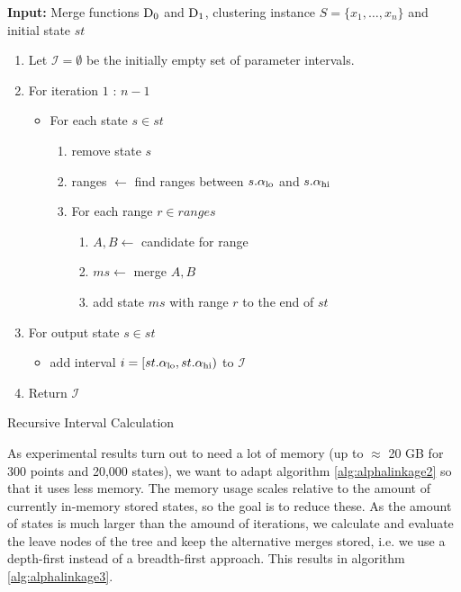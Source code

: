 \begin{algorithm}
    \textbf{Input:} Merge functions $\operatorname{D_{0}}$ and $\operatorname{D_{1}}$, clustering instance $S = \{x_1, \dots, x_n\}$ and initial state $st$
    \begin{enumerate}[nosep, leftmargin=*]
    \item Let $\mathcal{I} = \emptyset$ be the initially empty set of parameter intervals.
    \item For iteration $1$ : $n-1$
    \begin{itemize}[nosep, leftmargin=*]
        \item For each state $s \in st$
        \begin{enumerate}[nosep, leftmargin=*]
            \item remove state $s$
            \item ranges $\gets$ find ranges between $s.\alpha_\text{lo}$ and $s.\alpha_\text{hi}$
            \item For each range $r \in ranges$
            \begin{enumerate}
                \item $A, B \gets$ candidate for range
                \item $ms \gets$ merge $A, B$\;
                \item add state $ms$ with range $r$ to the end of $st$
            \end{enumerate}
        \end{enumerate}
    \end{itemize}
    \item For output state $s \in st$
            \begin{itemize}
                \item add interval $i = [st.\alpha_\text{lo}, st.\alpha_\text{hi})$ to $\mathcal{I}$
            \end{itemize}
        \item Return $\mathcal{I}$
    \end{enumerate}
    \caption{Recursive Interval Calculation}
    \label{alg:alphalinkage2}
\end{algorithm}

As experimental results turn out to need a lot of memory (up to $\approx$ 20 GB for 300 points and 20,000 states), we want to adapt algorithm \ref{alg:alphalinkage2} so that it uses less memory. The memory usage scales relative to the amount of currently in-memory stored states, so the goal is to reduce these. As the amount of states is much larger than the amound of iterations, we calculate and evaluate the leave nodes of the tree and keep the alternative merges stored, i.e. we use a depth-first instead of a breadth-first approach. This results in algorithm \ref{alg:alphalinkage3}.

